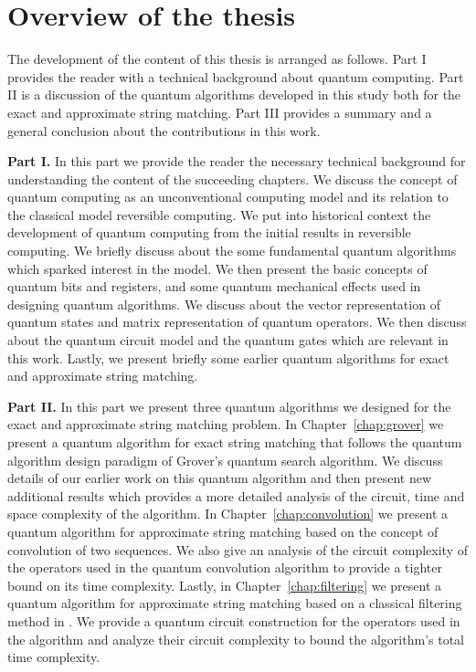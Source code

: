 \section*{Overview of the thesis}

The development of the content of this thesis is arranged as follows. Part I provides the reader with a technical background about quantum computing. Part II is a discussion of the quantum algorithms developed in this study both for the exact and approximate string matching. Part III provides a summary and a general conclusion about the contributions in this work.

\textbf{Part I.} In this part we provide the reader the necessary technical background for understanding the content of the succeeding chapters. We discuss the concept of quantum computing as an unconventional computing model and its relation to the classical model reversible computing. We put into historical context the development of quantum computing from the initial results in reversible computing. We briefly discuss about the some fundamental quantum algorithms which sparked interest in the model. We then present the basic concepts of quantum bits and registers, and some quantum mechanical effects used in designing quantum algorithms. We discuss about the vector representation of quantum states and matrix representation of quantum operators. We then discuss about the quantum circuit model and the quantum gates which are relevant in this work. Lastly, we present briefly some earlier quantum algorithms for exact and approximate string matching.

\textbf{Part II.} In this part we present three quantum algorithms we designed for the exact and approximate string matching problem. In Chapter~\ref{chap:grover} we present a quantum algorithm for exact string matching that follows the quantum algorithm design paradigm of Grover's quantum search algorithm. We discuss details of our earlier work on this quantum algorithm \cite{Aborot2013} and then present new additional results which provides a more detailed analysis of the circuit, time and space complexity of the algorithm. In Chapter~\ref{chap:convolution} we present a quantum algorithm for approximate string matching based on the concept of convolution of two sequences. We also give an analysis of the circuit complexity of the operators used in the quantum convolution algorithm to provide a tighter bound on its time complexity. Lastly, in Chapter~\ref{chap:filtering} we present a quantum algorithm for approximate string matching based on a classical filtering method in \cite{Amir2004}. We provide a quantum circuit construction for the operators used in the algorithm and analyze their circuit complexity to bound the algorithm's total time complexity.

